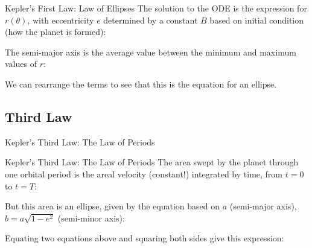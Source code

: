 \documentclass[12pt,compress,aspectratio=169]{beamer}
\begin{document}
\begin{frame}{Kepler's First Law: Law of Ellipses}
  The solution to the ODE is the expression for $r(\theta)$, with eccentricity
  $e$ determined by a constant $B$ based on initial condition (how the planet
  is formed):


  The semi-major axis is the average value between the minimum and maximum
  values of $r$:
  

  We can rearrange the terms to see that this is the equation for an ellipse.
\end{frame}



\subsection{Third Law}

\begin{frame}{Kepler's Third Law: The Law of Periods}
  \centering

  \vspace{.2in}
\end{frame}



\begin{frame}{Kepler's Third Law: The Law of Periods}
  The area swept by the planet through one orbital period is the areal velocity
  (constant!) integrated by time, from $t=0$ to $t=T$:

  
  But this area is an ellipse, given by the equation based on $a$ (semi-major
  axis), $b=a\sqrt{1-e^2}$ (semi-minor axis):


  \vspace{-.1in}Equating two equations above and squaring both sides give this
  expression:

\end{frame}
\end{document}
